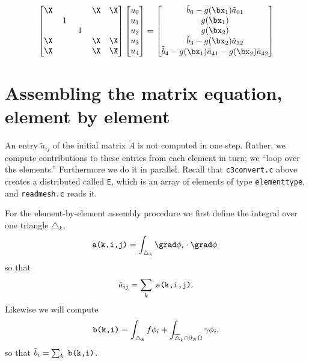 \begin{example}
\begin{equation*}
\begin{bmatrix}
\X & & & \X & \X \\
 & \,1\, & & & \\
 & & \,1\, & & \\
\X & & & \X & \X \\
\X & & & \X & \X
\end{bmatrix}
\begin{bmatrix}
u_0 \\
u_1 \\
u_2 \\
u_3 \\
u_4
\end{bmatrix}
=
\begin{bmatrix}
\tilde b_0 - g(\bx_1) \tilde a_{01} \\
g(\bx_1) \\
g(\bx_2) \\
\tilde b_3 - g(\bx_2) \tilde a_{32} \\
\tilde b_4 - g(\bx_1) \tilde a_{41} - g(\bx_2) \tilde a_{42}
\end{bmatrix}
\end{equation*}
\end{example}
\noindent\hrulefill

\bigskip


\section{Assembling the matrix equation, element by element}

An entry $\tilde a_{ij}$ of the initial matrix $\tilde A$ is not computed in one step.  Rather, we compute contributions to these entries from each element in turn; we ``loop over the elements.''  Furthermore we do it in parallel.  Recall that \texttt{c3convert.c} above creates a distributed \pVec called \texttt{E}, which is an array of elements of type \texttt{elementtype}, and \texttt{readmesh.c} reads it.

For the element-by-element assembly procedure we first define the integral over one triangle $\triangle_k$,
\begin{equation}
\text{\texttt{a(k,i,j)}} = \int_{\triangle_k} \grad \phi_i \cdot \grad \phi_. \label{aelementintegral}
\end{equation}
so that
    $$\tilde a_{ij} = \sum_k \phantom{.}\text{\texttt{a(k,i,j)}}.$$
Likewise we will compute
\begin{equation}
\text{\texttt{b(k,i)}} = \int_{\triangle_k} f \phi_i + \int_{\overline{\triangle}_k \cap \partial_N\Omega} \gamma \phi_i, \label{belementintegral}
\end{equation}
so that $\tilde b_i = \sum_{k} \;\text{\texttt{b(k,i)}}$.

